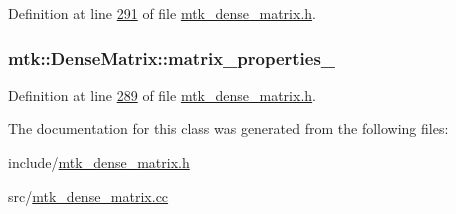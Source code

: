 Definition at line \hyperlink{mtk__dense__matrix_8h_source_l00291}{291} of file \hyperlink{mtk__dense__matrix_8h_source}{mtk\+\_\+dense\+\_\+matrix.\+h}.

\hypertarget{classmtk_1_1DenseMatrix_a481c8d09af685a5ba67acefdcaa810cc}{
\subsubsection[{matrix\+\_\+properties\+\_\+}]{ mtk\+::\+Dense\+Matrix\+::matrix\+\_\+properties\+\_\+\hspace{0.3cm}{\ttfamily [private]}}}\label{classmtk_1_1DenseMatrix_a481c8d09af685a5ba67acefdcaa810cc}


Definition at line \hyperlink{mtk__dense__matrix_8h_source_l00289}{289} of file \hyperlink{mtk__dense__matrix_8h_source}{mtk\+\_\+dense\+\_\+matrix.\+h}.



The documentation for this class was generated from the following files\+:\begin{DoxyCompactItemize}
\item 
include/\hyperlink{mtk__dense__matrix_8h}{mtk\+\_\+dense\+\_\+matrix.\+h}\item 
src/\hyperlink{mtk__dense__matrix_8cc}{mtk\+\_\+dense\+\_\+matrix.\+cc}\end{DoxyCompactItemize}
